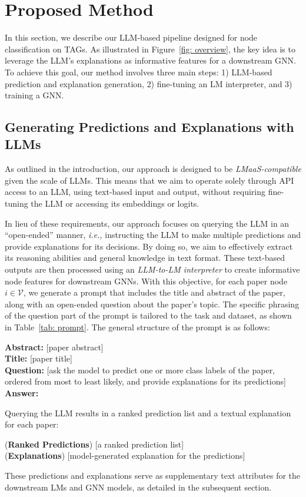 \documentclass{article}
\newcommand{\ie}{\emph{i.e.,}\xspace}
\begin{document}
\section{Proposed Method}
In this section, we describe our LLM-based pipeline designed for node classification on TAGs. As illustrated in Figure~\ref{fig: overview}, the key idea
is to leverage the LLM's explanations as informative features for a downstream GNN. To achieve this goal, our method involves three main steps: 1) LLM-based prediction and explanation generation, 2) fine-tuning an LM interpreter, and 3) training a GNN.


\subsection{Generating Predictions and Explanations with LLMs}
As outlined in the introduction, our approach is designed to be \emph{LMaaS-compatible} given the scale of LLMs. This means that we aim to operate solely through API access to an LLM, using text-based input and output, without requiring fine-tuning the LLM or accessing its embeddings or logits.


In lieu of these requirements, our approach focuses on querying the LLM in an ``open-ended'' manner, \ie instructing the LLM to make multiple predictions and provide explanations for its decisions. By doing so, we aim to effectively extract its reasoning abilities and general knowledge in text format. These text-based outputs are then processed using an \emph{LLM-to-LM interpreter} to create informative node features for downstream GNNs. With this objective, for each paper node $i \in \mathcal{V}$, we generate a prompt that includes the title and abstract of the paper, along with an open-ended question about the paper's topic. The specific phrasing of the question part of the prompt is tailored to the task and dataset, as shown in Table~\ref{tab: prompt}. The general structure of the prompt is as follows:
\begin{tcolorbox}\textbf{Abstract:} [paper abstract]\\
\textbf{Title:} [paper title]\\
\textbf{Question:} [ask the model to predict one or more class labels of the paper, ordered from most to least likely, and provide explanations for its predictions]\\
\textbf{Answer:}
\end{tcolorbox}

Querying the LLM results in a ranked prediction list and a textual explanation for each paper:
\begin{tcolorbox}(\textbf{Ranked Predictions}) [a ranked prediction list]\\
(\textbf{Explanations}) [model-generated explanation for the predictions]
\end{tcolorbox}
These predictions and explanations serve as supplementary text attributes for the downstream LMs and GNN models, as detailed in the subsequent section.
\end{document}

